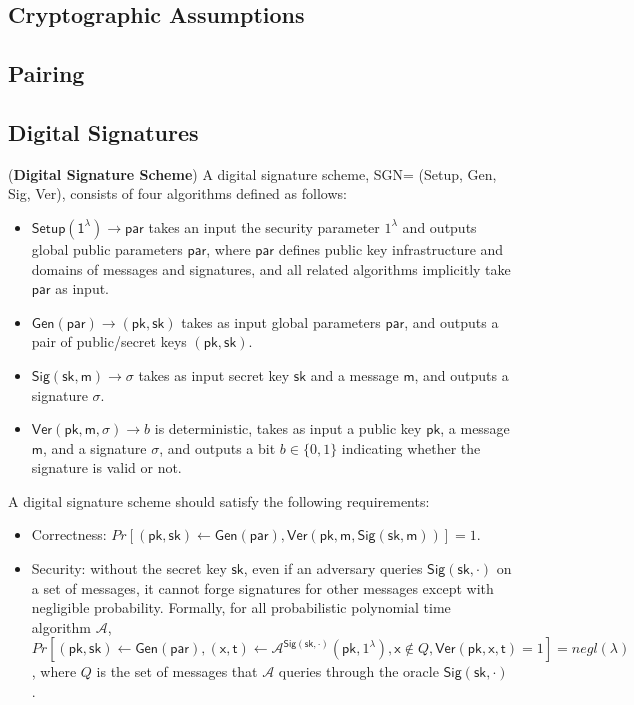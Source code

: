 \subsection{Cryptographic Assumptions}

\subsection{Pairing}

\subsection{Digital Signatures}

\begin{definition}{(\textbf{Digital Signature Scheme})} A digital signature scheme, {\sffamily SGN= (Setup, Gen, Sig, Ver)}, consists of four algorithms defined as follows: 
\end{definition}
\begin{itemize}
    \item $\mathsf{Setup(1^\lambda) \to par}$ takes an input the security parameter $1^\lambda$ and outputs global public parameters $\mathsf{par}$, where $\mathsf{par}$ defines public key infrastructure and domains of messages and signatures, and all related algorithms implicitly take $\mathsf{par}$ as input.  
    \item $\mathsf{Gen(par)} \to (\mathsf{pk}, \mathsf{sk})$ takes as input global parameters $\mathsf{par}$, and outputs a pair of public/secret keys $(\mathsf{pk}, \mathsf{sk})$. 
    \item $\mathsf{Sig(sk, m)} \to \sigma$ takes as input secret key $\mathsf{sk}$ and a message $\mathsf{m}$, and outputs a signature $\sigma$. 
    \item $\mathsf{Ver}(\mathsf{pk}, \mathsf{m}, \sigma) \to b $ is deterministic, takes as input a public key $\mathsf{pk}$, a message $\mathsf{m}$, and a signature $\sigma$,  and outputs a bit $b\in\{0,1\}$ indicating whether the signature is valid or not. 
\end{itemize}

A digital signature scheme should satisfy the following requirements:
\begin{itemize}
    \item Correctness: $Pr[(\mathsf{pk}, \mathsf{sk})\leftarrow \mathsf{Gen(par)}, \mathsf{Ver(pk, m, Sig(sk, m))}]=1$. 
    \item Security: without the secret key $\mathsf{sk}$, even if an adversary queries $\mathsf{Sig(sk, \cdot)}$ on a set of messages, it cannot forge signatures for other messages except with negligible probability. Formally, for all probabilistic polynomial time algorithm $\mathcal{A}$, $Pr[(\mathsf{pk}, \mathsf{sk})\leftarrow \mathsf{Gen(par)}, (\mathsf{x},\mathsf{t})\leftarrow \mathcal{A}^{\mathsf{Sig(sk, \cdot)}}(\mathsf{pk}, 1^\lambda), \mathsf{x}\notin Q, \mathsf{Ver(pk, x, t)}=1] = negl(\lambda)$, where $Q$ is the set of messages that $\mathcal{A}$ queries through the oracle $\mathsf{Sig(sk, \cdot)}$. 
    
\end{itemize}

